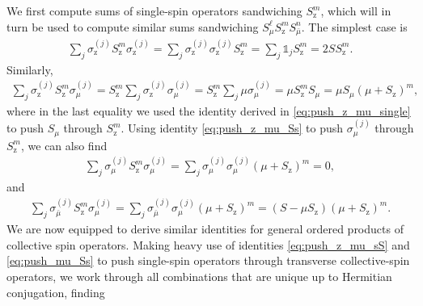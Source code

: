 \documentclass[aps,notitlepage,nofootinbib,11pt]{revtex4-1}
\newcommand{\p}[1]{\left(#1\right)} %
\newcommand{\z}{\text{z}}
\newcommand{\bmu}{{\bar\mu}}
\newcommand{\1}{\mathds{1}}
\begin{document}
We first compute sums of single-spin operators sandwiching $S_\z^m$,
which will in turn be used to compute similar sums sandwiching
$S_\mu^\ell S_\z^m S_\bmu^n$.  The simplest case is
\begin{align}
  \sum_j \sigma_\z^{(j)} S_\z^m \sigma_\z^{(j)}
  = \sum_j \sigma_\z^{(j)} \sigma_\z^{(j)} S_\z^m
  = \sum_j \1_j S_\z^m
  = 2 S S_\z^m.
\end{align}
Similarly,
\begin{align}
  \sum_j \sigma_\z^{(j)} S_\z^m \sigma_\mu^{(j)}
  = S_\z^m \sum_j \sigma_\z^{(j)} \sigma_\mu^{(j)}
  = S_\z^m \sum_j \mu \sigma_\mu^{(j)}
  = \mu S_\z^m S_\mu
  = \mu S_\mu \p{\mu+S_\z}^m,
\end{align}
where in the last equality we used the identity derived in
\eqref{eq:push_z_mu_single} to push $S_\mu$ through $S_\z^m$.  Using
identity \eqref{eq:push_z_mu_Ss} to push $\sigma_\mu^{(j)}$ through
$S_\z^m$, we can also find
\begin{align}
  \sum_j \sigma_\mu^{(j)} S_\z^m \sigma_\mu^{(j)}
  = \sum_j \sigma_\mu^{(j)} \sigma_\mu^{(j)} \p{\mu+S_\z}^m
  = 0,
\end{align}
and
\begin{align}
  \sum_j \sigma_\bmu^{(j)} S_\z^m \sigma_\mu^{(j)}
  = \sum_j \sigma_\bmu^{(j)} \sigma_\mu^{(j)} \p{\mu+S_\z}^m
  = \p{S-\mu S_\z} \p{\mu+S_\z}^m.
\end{align}
We are now equipped to derive similar identities for general ordered
products of collective spin operators.  Making heavy use of identities
\eqref{eq:push_z_mu_sS} and \eqref{eq:push_mu_Ss} to push single-spin
operators through transverse collective-spin operators, we work
through all combinations that are unique up to Hermitian conjugation,
finding
\end{document}
